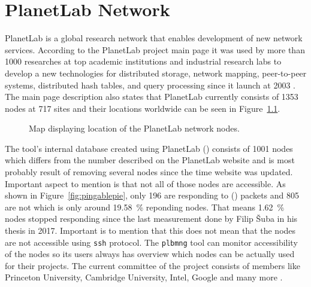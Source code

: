 \chapter{PlanetLab Network}
\label{chapter:planetlabnetwork}
PlanetLab is a global research network that enables development of new network services. According to the PlanetLab project main page it was used by more than 1000 researches at top academic institutions and industrial research labs to develop a new technologies for distributed storage, network mapping, peer-to-peer systems, distributed hash tables, and query processing since it launch at 2003 \cite{planetlabmain}. The main page description also states that PlanetLab currently consists of 1353 nodes at 717 sites and their locations worldwide can be seen in Figure~\ref{fig:location}.

\begin{figure}[H]
	\centering
	\caption{Map displaying location of the PlanetLab network nodes.}
	\label{fig:location}
\end{figure}

The tool's internal database created using PlanetLab  () consists of 1001 nodes which differs from the number described on the PlanetLab website and is most probably result of removing several nodes since the time website was updated. Important aspect to mention is that not all of those nodes are accessible. As shown in Figure~\ref{fig:pingablepie}, only 196 are responding to  () packets and 805 are not which is only around \SI{19.58}{\percent} reponding nodes. That means \SI{1.62}{\percent} nodes stopped responding since the last measurement done by Filip Šuba in his thesis \cite{suba1} in 2017. Important is to mention that this does not mean that the nodes are not accessible using \texttt{ssh} protocol. The \texttt{plbmng} tool can monitor accessibility of the nodes so its users always has overview which nodes can be actually used for their projects. The current committee of the project consists of members like Princeton University, Cambridge University, Intel, Google and many more \cite{planetlabmain}.\\


